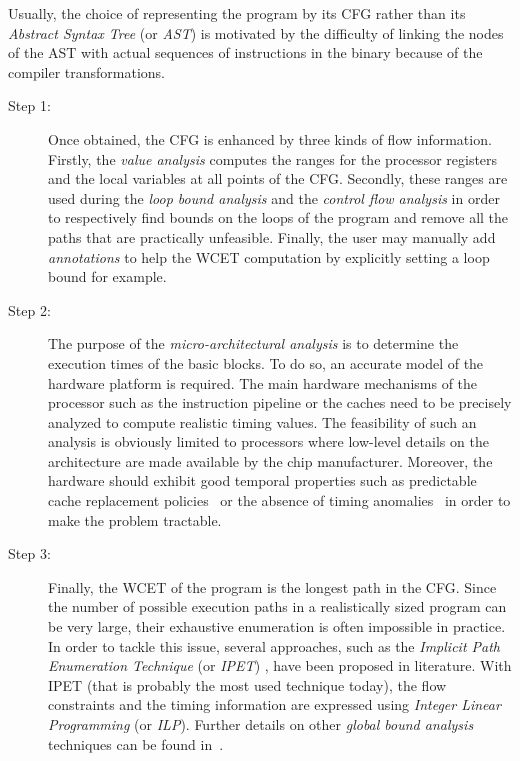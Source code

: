 \documentclass[main.tex]{subfiles}
\begin{document}
\begin{remark}
    Usually, the choice of representing the program by its CFG rather than its
    \emph{Abstract Syntax Tree} (or \emph{AST}) is motivated by the difficulty
    of linking the nodes of the AST with actual sequences of instructions in
    the binary because of the compiler transformations.
\end{remark}

\begin{description}
    \item[Step 1:] Once obtained, the CFG is enhanced by three kinds of flow
        information. Firstly, the \emph{value analysis} computes the ranges for
        the processor registers and the local variables at all points of the
        CFG. Secondly, these ranges are used during the \emph{loop bound
        analysis} and the \emph{control flow analysis} in order to respectively
        find bounds on the loops of the program and remove all the paths that
        are practically unfeasible. Finally, the user may manually add
        \emph{annotations} to help the WCET computation by explicitly setting a
        loop bound for example.

    \item[Step 2:] The purpose of the \emph{micro-architectural analysis} is to
        determine the execution times of the basic blocks. To do so, an
        accurate model of the hardware platform is required. The main hardware
        mechanisms of the processor such as the instruction pipeline or the
        caches need to be precisely analyzed to compute realistic timing
        values. The feasibility of such an analysis is obviously limited to
        processors where low-level details on the architecture are made
        available by the chip manufacturer. Moreover, the hardware should
        exhibit good temporal properties such as predictable cache replacement
        policies~\cite{Wilhelm2009} or the absence of timing
        anomalies~\cite{Lundqvist1999} in order to make the problem tractable. 

    \item[Step 3:] Finally, the WCET of the program is the longest path in the
        CFG. Since the number of possible execution paths in a realistically
        sized program can be very large, their exhaustive enumeration is often
        impossible in practice. In order to tackle this issue, several
        approaches, such as the \emph{Implicit Path Enumeration Technique} (or
        \emph{IPET}) \cite{Li1995}, have been proposed in literature. With IPET
        (that is probably the most used technique today), the flow constraints
        and the timing information are expressed using \emph{Integer Linear
        Programming} (or \emph{ILP}). Further details on other \emph{global
        bound analysis} techniques can be found in~\cite{Wilhelm2008}.
\end{description}
\end{document}
